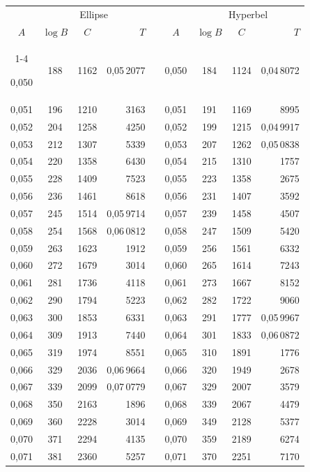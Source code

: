\begin{tabular}{|c|c|c|r|@{}p{9pt}@{}|c|c|c|r|}
\hline
\rule{0pt}{8.5pt} & \multicolumn{3}{c|}{Ellipse} & & & \multicolumn{3}{c|}{Hyperbel} \\
\(A\) & \(\log B\) & \(C\) & \(T\) & & \(A\) & \(\log B\) & \(C\) & \(T\) \\
\cline{1-4}\cline{6-9}
\rule{0pt}{8.5pt}0,050 & 188 & 1162 & 0,05\,2077 &  & 0,050 & 184 & 1124 & 0,04\,8072 \\
0,051 & 196 & 1210 & 3163 &  & 0,051 & 191 & 1169 & 8995 \\
0,052 & 204 & 1258 & 4250 &  & 0,052 & 199 & 1215 & 0,04\,9917 \\
0,053 & 212 & 1307 & 5339 &  & 0,053 & 207 & 1262 & 0,05\,0838 \\
0,054 & 220 & 1358 & 6430 &  & 0,054 & 215 & 1310 & 1757 \\
0,055 & 228 & 1409 & 7523 &  & 0,055 & 223 & 1358 & 2675 \\[3pt]
0,056 & 236 & 1461 & 8618 &  & 0,056 & 231 & 1407 & 3592 \\
0,057 & 245 & 1514 & 0,05\,9714 &  & 0,057 & 239 & 1458 & 4507 \\
0,058 & 254 & 1568 & 0,06\,0812 &  & 0,058 & 247 & 1509 & 5420 \\
0,059 & 263 & 1623 & 1912 &  & 0,059 & 256 & 1561 & 6332 \\
0,060 & 272 & 1679 & 3014 &  & 0,060 & 265 & 1614 & 7243 \\[3pt]
0,061 & 281 & 1736 & 4118 &  & 0,061 & 273 & 1667 & 8152 \\
0,062 & 290 & 1794 & 5223 &  & 0,062 & 282 & 1722 & 9060 \\
0,063 & 300 & 1853 & 6331 &  & 0,063 & 291 & 1777 & 0,05\,9967 \\
0,064 & 309 & 1913 & 7440 &  & 0,064 & 301 & 1833 & 0,06\,0872 \\
0,065 & 319 & 1974 & 8551 &  & 0,065 & 310 & 1891 & 1776 \\[3pt]
0,066 & 329 & 2036 & 0,06\,9664 &  & 0,066 & 320 & 1949 & 2678 \\
0,067 & 339 & 2099 & 0,07\,0779 &  & 0,067 & 329 & 2007 & 3579 \\
0,068 & 350 & 2163 & 1896 &  & 0,068 & 339 & 2067 & 4479 \\
0,069 & 360 & 2228 & 3014 &  & 0,069 & 349 & 2128 & 5377 \\
0,070 & 371 & 2294 & 4135 &  & 0,070 & 359 & 2189 & 6274 \\[3pt]
0,071 & 381 & 2360 & 5257 &  & 0,071 & 370 & 2251 & 7170 \\

\end{tabular}

